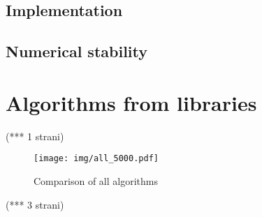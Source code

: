 \documentclass[a4paper,11pt]{article}
\begin{document}
\subsection{Implementation}

\subsection{Numerical stability}

\section{Algorithms from libraries}
(*** 1 strani)



\begin{figure}[h]
\centering
\texttt{[image: img/all\_5000.pdf]}
\caption{Comparison of all algorithms}
\label{fig:classic}
\end{figure}
(*** 3 strani)
\end{document}
